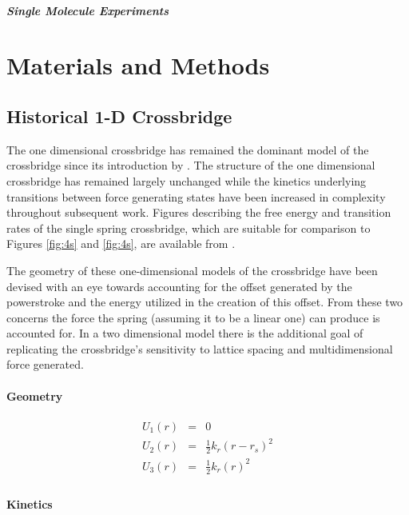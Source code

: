 \documentclass[]{article}
\begin{document}
\subparagraph*{Single Molecule Experiments}



\section*{Materials and Methods}


\subsection*{Historical 1-D Crossbridge}

The one dimensional crossbridge has remained the dominant model of the crossbridge since its introduction by \citet{Huxley1957e}. The structure of the one dimensional crossbridge has remained largely unchanged while the kinetics underlying transitions between force generating states have been increased in complexity throughout subsequent work. \citep{PateCooke1988, Daniel1998a,Chase2004a,Tanner2007a}
Figures describing the free energy and transition rates of the single spring crossbridge, which are suitable for comparison to Figures \ref{fig:4s} and \ref{fig:4s}, are available from \citet{Tanner2007a}.

The geometry of these one-dimensional models of the crossbridge have been devised with an eye towards accounting for the offset generated by the powerstroke and the energy utilized in the creation of this offset. 
From these two concerns the force the spring (assuming it to be a linear one) can produce is accounted for. 
In a two dimensional model there is the additional goal of replicating the crossbridge's sensitivity to lattice spacing and multidimensional force generated. 

\paragraph*{Geometry}


\begin{eqnarray}
\label{1sEnergy}
    U_1(r) & = & 0 \nonumber \\
    U_2(r) & = & \frac{1}{2}k_r (r-r_s)^2 \nonumber \\
    U_3(r) & = & \frac{1}{2}k_r (r)^2 \\
\end{eqnarray}

 
\paragraph*{Kinetics}
\end{document}
